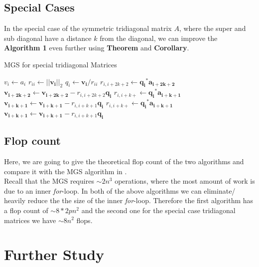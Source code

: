 \documentclass{article}
\numberwithin{pic}{section}
\numberwithin{lem}{section}
\numberwithin{thm}{section}
\numberwithin{cor}{section}
\theoremstyle{definition}
\numberwithin{ex}{section}
\numberwithin{defn}{section}
\theoremstyle{definition}
\theoremstyle{remark}
\newcommand{\norm}[1]{\ensuremath{\left | \left | #1 \right | \right |}}
\begin{document}
\subsection{Special Cases}
In the special case of the symmetric tridiagonal matrix $A$, where the super and sub diagonal have a distance $k$ from the diagonal, we can improve the \textbf{Algorithm 1} even further using \textbf{Theorem} and \textbf{Corollary}.
\begin{algorithm}[H]
  \caption{MGS for special tridiagonal Matrices }
  \begin{algorithmic}[1]
   	\State$v_i\gets a_i$
    \EndFor
    \State$r_{ii}\gets \norm{\mathbf{v_i}}_2$
    \State$q_i\gets \mathbf{v_i} / r_{ii}$ 
    	\State$r_{i,i+2k+2}\gets \mathbf{q_i}^*\mathbf{a_{i+2k+2}}$
    	\State$\mathbf{v_{i+2k+2}}\gets\mathbf{v_{i+2k+2}} - r_{i,i+2k+2}\mathbf{q_i}$
    	\State$r_{i,i+k+}\gets \mathbf{q_i}^*\mathbf{a_{i+k+1}}$
    	\State$\mathbf{v_{i+k+1}}\gets\mathbf{v_{i+k+1}} - r_{i,i+k+1}\mathbf{q_i}$
    	\State$r_{i,i+k+}\gets \mathbf{q_i}^*\mathbf{a_{i+k+1}}$
    	\State$\mathbf{v_{i+k+1}}\gets\mathbf{v_{i+k+1}} - r_{i,i+k+1}\mathbf{q_i}$
       	\EndIf
    \EndFor
  \end{algorithmic}
\end{algorithm}
\subsection{Flop count}
Here, we are going to give the theoretical flop count of the two algorithms and compare it with the MGS algorithm in \cite{nla}.\\
Recall that the MGS requires $\sim 2n^3$ operations, where the most amount of work is due to an inner \textit{for}-loop.
In both of the above algorithms we can eliminate/ heavily reduce the the size of the inner \textit{for}-loop.
Therefore the first algorithm has a flop count of $\sim 8*2pn^2$ and the second one for the special case tridiagonal matrices we have $\sim 8n^2$ flops.
\section{Further Study}

	
	
\end{document}
